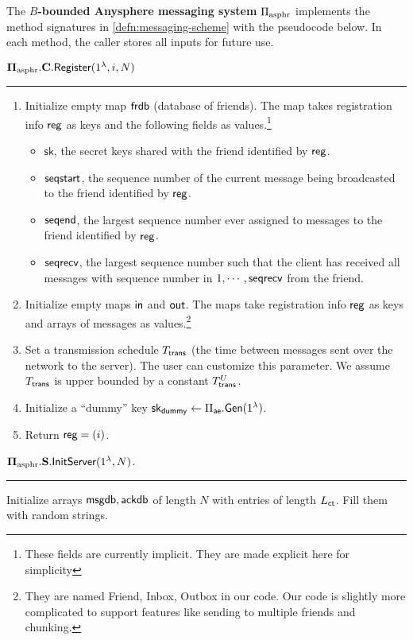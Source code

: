 \begin{definition}
\label{defn:asphr-code}
The \textbf{$B$-bounded Anysphere messaging system} $\Pi_{\text{asphr}}$ implements the method signatures in \cref{defn:messaging-scheme} with the pseudocode below. In each method, the caller stores all inputs for future use.
\vspace{10pt}

$\mathbf{\Pi_{\text{asphr}}.C.\mathsf{Register}}(1^{\lambda}, i, N)$
\vspace{5pt}
\hrule
\vspace{5pt}
\begin{enumerate}
    \item Initialize empty map $\mathsf{frdb}$ (database of friends). The map takes registration info $\mathsf{reg}$ as keys and the following fields as values.\footnote{These fields are currently implicit. They are made explicit here for simplicity}
    \begin{itemize}
        \item $\mathsf{sk}$, the secret keys shared with the friend identified by $\mathsf{reg}$.
        \item $\mathsf{seqstart}$, the sequence number of the current message being broadcasted to the friend identified by $\mathsf{reg}$.
        \item $\mathsf{seqend}$, the largest sequence number ever assigned to messages to the friend identified by $\mathsf{reg}$.
        \item $\mathsf{seqrecv}$, the largest sequence number such that the client has received all messages with sequence number in $1,\cdots,\mathsf{seqrecv}$ from the friend.
    \end{itemize}

    \item Initialize empty maps $\mathsf{in}$ and $\mathsf{out}$. The maps take registration info $\mathsf{reg}$ as keys and arrays of messages as values.\footnote{They are named Friend, Inbox, Outbox in our code. Our code is slightly more complicated to support features like sending to multiple friends and chunking.}
    \item Set a transmission schedule $T_{\mathsf{trans}}$ (the time between messages sent over the network to the server). The user can customize this parameter. We assume $T_{\mathsf{trans}}$ is upper bounded by a constant $T_{\mathsf{trans}}^U$.
    \item Initialize a ``dummy'' key ${\mathsf{sk}}_{\mathsf{dummy}} \leftarrow \Pi_{\mathsf{ae}}.\mathsf{Gen}(1^{\lambda})$.
    \item Return $\mathsf{reg} = (i)$.
\end{enumerate}
\vspace{10pt}
$\mathbf{\Pi_{\text{asphr}}.S.\mathsf{InitServer}}(1^{\lambda}, N)$.
\vspace{5pt}
\hrule
\vspace{5pt}
Initialize arrays $\mathsf{msgdb}, \mathsf{ackdb}$ of length $N$ with entries of length $L_{\mathsf{ct}}$. Fill them with random strings.


\end{definition}
